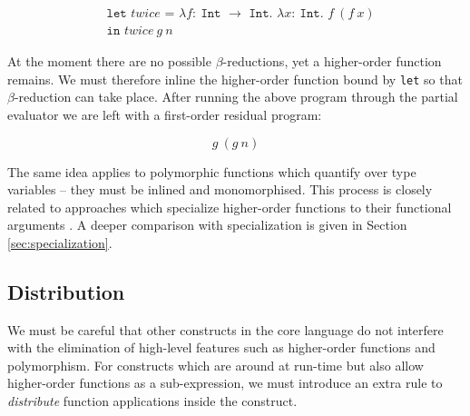 \documentclass[runningheads]{llncs}
\begin{document}
\begin{equation*}
  \begin{split}
    &\texttt{let $twice$ = $\lambda f :\ $Int $\rightarrow$ Int. $\lambda x :\ $Int. $f\ (f\ x)$} \\
    &\texttt{in $twice\ g\ n$}
  \end{split}
\end{equation*}

At the moment there are no possible $\beta$-reductions, yet a higher-order function remains. We must therefore inline the higher-order function bound by \texttt{let} so that $\beta$-reduction can take place. After running the above program through the partial evaluator we are left with a first-order residual program:

\begin{equation*}
  g\ (g\ n)
\end{equation*}

The same idea applies to polymorphic functions which quantify over type variables -- they must be inlined and monomorphised. This process is closely related to approaches which specialize higher-order functions to their functional arguments \cite{chin1996higher}. A deeper comparison with specialization is given in Section \ref{sec:specialization}.

\subsection{Distribution} \label{sec:distribution}

We must be careful that other constructs in the core language do not interfere with the elimination of high-level features such as higher-order functions and polymorphism. For constructs which are around at run-time but also allow higher-order functions as a sub-expression, we must introduce an extra rule to \emph{distribute} function applications inside the construct.



\end{document}
